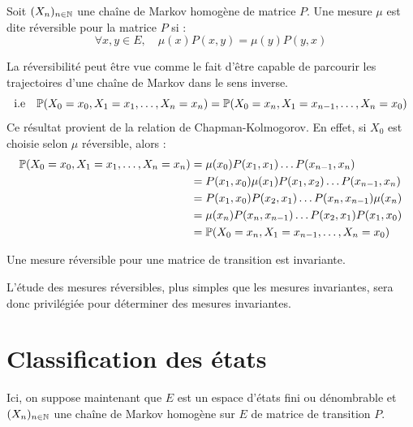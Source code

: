 \begin{definition}
    Soit $(X_n)_{n \in \mathbb{N}}$ une chaîne de Markov homogène de matrice $P$. Une mesure $ \mu$ est dite 
    réversible pour la matrice $P$ si : 
        \[ \boxed{\forall x,y \in E, \quad \mu(x) P(x,y) = \mu(y) P(y,x)} \] 
\end{definition}

\begin{remark}
    La réversibilité peut être vue comme le fait d'être capable de parcourir les trajectoires d'une chaîne de Markov 
    dans le sens inverse. 
        $$ \text{i.e} \quad \mathbb{P}(X_0 = x_0, X_1 = x_1, \dots, X_n = x_n) = \mathbb{P}(X_0 = x_n, X_1 = x_{n-1}, \dots, X_n = x_0) $$ 
    Ce résultat provient de la relation de Chapman-Kolmogorov. En effet, si $X_0$ est choisie selon $ \mu$ réversible, 
    alors : 
        \begin{align*}
            \mathbb{P}(X_0 = x_0, X_1 = x_1, \dots, X_n = x_n) &= \mu(x_0) P(x_1, x_1) \dots P(x_{n-1}, x_n) \\ 
            &= P(x_1, x_0) \mu(x_1) P(x_1, x_2) \dots P(x_{n-1}, x_n) \\
            &= P(x_1, x_0) P(x_2, x_1) \dots P(x_n, x_{n-1}) \mu(x_n) \\ 
            &= \mu(x_n) P(x_n, x_{n-1}) \dots P(x_2, x_1) P(x_1, x_0) \\ 
            &= \mathbb{P}(X_0 = x_n, X_1 = x_{n-1}, \dots, X_n = x_0)
        \end{align*}
\end{remark}

\begin{proposition}
    Une mesure réversible pour une matrice de transition est invariante. 
\end{proposition}

L'étude des mesures réversibles, plus simples que les mesures invariantes, sera donc privilégiée pour déterminer 
des mesures invariantes. 



\section{Classification des états}

Ici, on suppose maintenant que $E$ est un espace d'états fini ou dénombrable et $(X_n)_{n \in \mathbb{N}}$ une chaîne 
de Markov homogène sur $E$ de matrice de transition $P$. 

